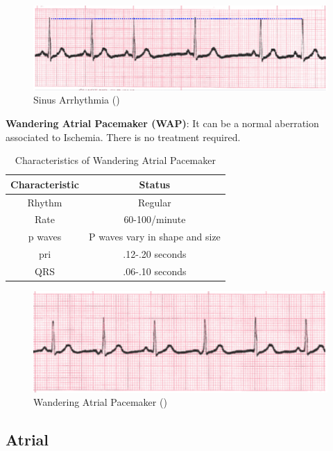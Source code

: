  \begin{figure}[H]
\centering
\includegraphics[scale=0.9]{img/SA.png}
\caption{Sinus Arrhythmia (\cite{arryth_types})}
\label{fig:SA}
\end{figure}

\textbf{Wandering Atrial Pacemaker (WAP)}: It can be a normal aberration associated to Ischemia. There is no treatment required.

\begin{table}[H]
\begin{center}
\begin{tabular}{||c || c||}
 \hline
\textbf{Characteristic} & \textbf{Status} \\ [0.4ex] 
 \hline\hline
 Rhythm & Regular \\
\hline
Rate & 60-100/minute \\
\hline
p waves & P waves vary in shape and size \\
\hline
pri & .12-.20 seconds \\
\hline
QRS & .06-.10 seconds \\
\hline\hline
\end{tabular}
\end{center}
\caption{Characteristics of Wandering Atrial Pacemaker}
\label{table:WAP_characteristics}
\end{table}


 \begin{figure}[H]
\centering
\includegraphics[scale=0.9]{img/WAP.png}
\caption{Wandering Atrial Pacemaker (\cite{arryth_types})}
\label{fig:WAP}
\end{figure}

\subsection{Atrial}

